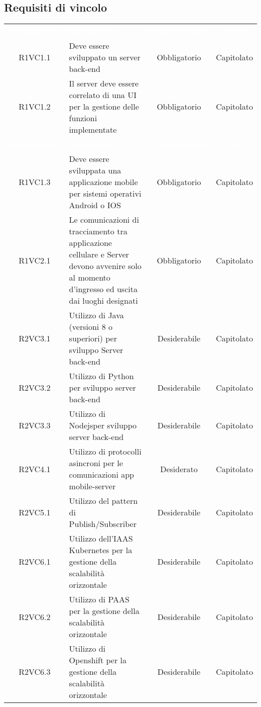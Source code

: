 \renewcommand{\o}{Obbligatorio}
\renewcommand{\d}{Desiderabile}
\subsection{Requisiti di vincolo}
{
\renewcommand{\arraystretch}{2}
\centering
\begin{longtable}{ c C{8cm} c c}
\textcolor{white}{\textbf{Identificativo}} & \textcolor{white}{\textbf{Descrizione}} & \textcolor{white}{\textbf{Classificazione}} & \textcolor{white}{\textbf{Fonti}}\\	

R1VC1.1 & Deve essere sviluppato un server back-end & \o & Capitolato \\
R1VC1.2 & Il server deve essere correlato di una UI per la gestione delle funzioni implementate& \o & Capitolato \\
\textcolor{white}{\textbf{Identificativo}} & \textcolor{white}{\textbf{Descrizione}} & \textcolor{white}{\textbf{Classificazione}} & \textcolor{white}{\textbf{Fonti}}\\	
R1VC1.3 & Deve essere sviluppata una applicazione mobile per sistemi operativi Android o IOS & \o & Capitolato \\
R1VC2.1 & Le comunicazioni di tracciamento tra applicazione cellulare e Server devono avvenire solo al momento d’ingresso ed uscita dai luoghi designati & \o & Capitolato \\
R2VC3.1 & Utilizzo di Java (versioni 8 o superiori) per sviluppo Server back-end & \d & Capitolato \\
R2VC3.2 & Utilizzo di Python per sviluppo server back-end & \d & Capitolato \\
R2VC3.3 & Utilizzo di Nodejsper sviluppo server back-end & \d & Capitolato \\
R2VC4.1 & Utilizzo di protocolli asincroni per le comunicazioni app mobile-server & Desiderato & Capitolato \\
R2VC5.1 & Utilizzo del pattern di Publish/Subscriber & \d & Capitolato \\
R2VC6.1 & Utilizzo dell’IAAS Kubernetes per la gestione della scalabilità orizzontale& \d & Capitolato \\
R2VC6.2 & Utilizzo di PAAS per la gestione della scalabilità orizzontale& \d & Capitolato \\
R2VC6.3 & Utilizzo di Openshift per la gestione della scalabilità orizzontale& \d & Capitolato \\

\end{longtable}}
